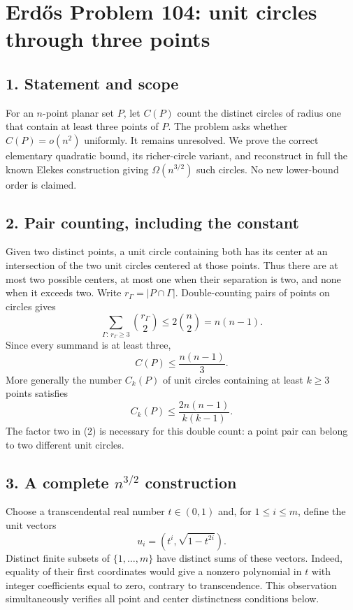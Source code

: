 \section*{Erd\H{o}s Problem 104: unit circles through three points}

\subsection*{1. Statement and scope}
For an $n$-point planar set $P$, let $C(P)$ count the distinct circles of radius one that contain at least three points of $P$. The problem asks whether $C(P)=o(n^2)$ uniformly. It remains unresolved. We prove the correct elementary quadratic bound, its richer-circle variant, and reconstruct in full the known Elekes construction giving $\Omega(n^{3/2})$ such circles. No new lower-bound order is claimed.

\subsection*{2. Pair counting, including the constant}
Given two distinct points, a unit circle containing both has its center at an intersection of the two unit circles centered at those points. Thus there are at most two possible centers, at most one when their separation is two, and none when it exceeds two. Write $r_\Gamma=|P\cap\Gamma|$. Double-counting pairs of points on circles gives
\[
 \sum_{\Gamma:\,r_\Gamma\ge3}\binom{r_\Gamma}{2}
 \le2\binom n2=n(n-1).
\]
Since every summand is at least three,
\[
 C(P)\le\frac{n(n-1)}3.\tag{1}
\]
More generally the number $C_k(P)$ of unit circles containing at least $k\ge3$ points satisfies
\[
 C_k(P)\le\frac{2n(n-1)}{k(k-1)}.\tag{2}
\]
The factor two in (2) is necessary for this double count: a point pair can belong to two different unit circles.

\subsection*{3. A complete $n^{3/2}$ construction}
Choose a transcendental real number $t\in(0,1)$ and, for $1\le i\le m$, define the unit vectors
\[
 u_i=(t^i,\sqrt{1-t^{2i}}).
\]
Distinct finite subsets of $\{1,\ldots,m\}$ have distinct sums of these vectors. Indeed, equality of their first coordinates would give a nonzero polynomial in $t$ with integer coefficients equal to zero, contrary to transcendence. This observation simultaneously verifies all point and center distinctness conditions below.

